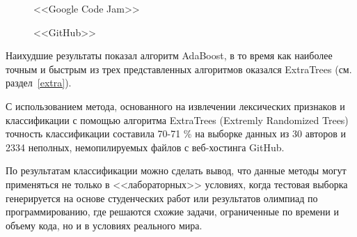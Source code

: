 \begin{figure}[h!]
\caption{ <<Google Code Jam>> }
\label{google:google}
\end{figure}

\begin{figure}[h!]
\caption{ <<GitHub>> }
\label{github:github}
\end{figure}

Наихудшие результаты показал алгоритм AdaBoost, в то время как наиболее точным и быстрым из трех 
представленных алгоритмов оказался ExtraTrees (см. раздел~\ref{extra}). 

С использованием метода, основанного на извлечении лексических признаков и классификации с помощью алгоритма 
ExtraTrees (Extremly Randomized Trees) точность классификации составила 70-71 \% на выборке данных из 30 авторов
и 2334 неполных, немопилируемых файлов с веб-хостинга GitHub. 

По результатам классификации можно сделать
вывод, что данные методы могут применяться не только в <<лабораторных>> условиях, когда
тестовая выборка генерируется на основе студенческих работ или результатов олимпиад по программированию,
где решаются схожие задачи, ограниченные по времени и объему кода, но и в условиях реального мира.

\clearpage